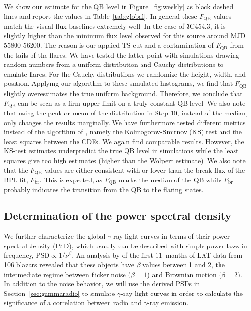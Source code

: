 \documentclass[twocolumn,linenumbers]{aastex62}
\newcommand{\gray}{$\gamma$-ray\xspace}
\begin{document}
We show our estimate for the QB level in Figure~\ref{fig:weekly} as black dashed lines and report the values in Table~\ref{tab:global}.
In general these $F_\mathrm{QB}$ values match 
the visual flux baselines extremely well. 
In the case of 3C454.3, it is slightly higher than the minimum flux level observed for this source around MJD 55800-56200. The reason is our applied $\mathrm{TS}$ cut and a contamination of $F_\mathrm{QB}$ from the tails of the flares. 
We have tested the latter point with simulations drawing random numbers from a uniform distribution and Cauchy distributions to emulate flares. 
For the Cauchy distributions we randomize the height, width, and position. 
Applying our algorithm to these simulated histograms, we find that $F_\mathrm{QB}$ slightly overestimates the true uniform background. Therefore, we conclude that $F_\mathrm{QB}$ can be seen as a firm upper limit on a truly constant QB level. 
We also note that using the peak or mean of the distribution in Step 10, instead of the median,  only changes the results marginally. 
We have furthermore tested different metrics instead of the algorithm of \citet{Wolpert1996}, namely the Kolmogorov-Smirnov (KS) test and the least squares between the CDFs. 
We again find comparable results. However, the KS-test estimates underpredict the true QB level in simulations while the least squares give too high estimates (higher than the Wolpert estimate).
We also note that the $F_\mathrm{QB}$ values are either consistent with or lower than the break flux of the BPL fit, $F_\mathrm{br}$.
This is expected, as $F_\mathrm{QB}$ marks the median of the QB while $F_\mathrm{br}$ probably indicates the transition from the QB to the flaring states. 

\subsection{Determination of the power spectral density}
We further characterize the global \gray light curves in terms of their power spectral density (PSD),
which usually can be described with simple power laws in frequency,  $\mathrm{PSD} \propto 1 / \nu^\beta$.
An analysis by \citet{2010ApJ...722..520A} of the first 11~months of LAT data from 106 blazars revealed that 
these objects have $\beta$ values between 1 and 2, the intermediate regime between flicker noise ($\beta = 1$) and Brownian motion ($\beta = 2)$. 
In addition to the noise behavior, 
we will use the derived PSDs in Section~\ref{sec:gammaradio} to simulate \gray light curves in order to calculate the significance of a correlation between radio and \gray emission. 
\end{document}
